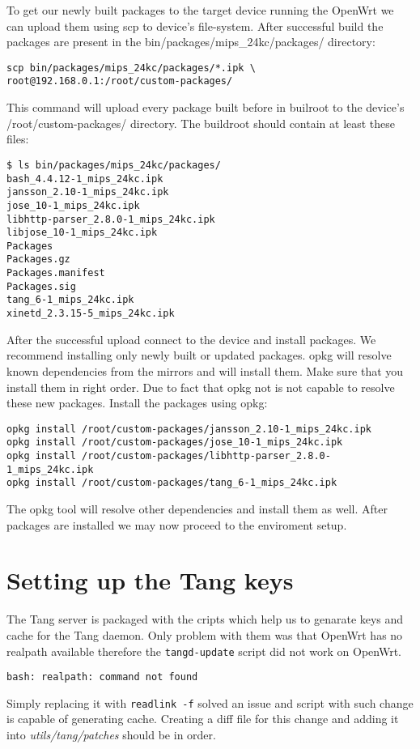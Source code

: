 To get our newly built packages to the target device running the OpenWrt we can upload them using scp to device's file-system.
After successful build the packages are present in the bin/packages/mips\_24kc/packages/ directory:
\begin{lstlisting}[columns=fixed,basicstyle=\ttfamily\footnotesize,tabsize=4,backgroundcolor=\color{yellow!10}]
scp bin/packages/mips_24kc/packages/*.ipk \
root@192.168.0.1:/root/custom-packages/
\end{lstlisting}
This command will upload every package built before in builroot to the device's /root/custom-packages/ directory.
The buildroot should contain at least these files:
\begin{lstlisting}[columns=fixed,basicstyle=\ttfamily\footnotesize,tabsize=4,backgroundcolor=\color{yellow!10}]
$ ls bin/packages/mips_24kc/packages/
bash_4.4.12-1_mips_24kc.ipk
jansson_2.10-1_mips_24kc.ipk
jose_10-1_mips_24kc.ipk
libhttp-parser_2.8.0-1_mips_24kc.ipk
libjose_10-1_mips_24kc.ipk
Packages
Packages.gz
Packages.manifest
Packages.sig
tang_6-1_mips_24kc.ipk
xinetd_2.3.15-5_mips_24kc.ipk
\end{lstlisting}
After the successful upload connect to the device and install packages.
We recommend installing only newly built or updated packages.
opkg will resolve known dependencies from the mirrors and will install them.
Make sure that you install them in right order.
Due to fact that opkg not is not capable to resolve these new packages.
Install the packages using opkg:
\begin{lstlisting}[columns=fixed,basicstyle=\ttfamily\footnotesize,tabsize=4,backgroundcolor=\color{yellow!10}]
opkg install /root/custom-packages/jansson_2.10-1_mips_24kc.ipk
opkg install /root/custom-packages/jose_10-1_mips_24kc.ipk
opkg install /root/custom-packages/libhttp-parser_2.8.0-1_mips_24kc.ipk
opkg install /root/custom-packages/tang_6-1_mips_24kc.ipk
\end{lstlisting}
The opkg tool will resolve other dependencies and install them as well.
After packages are installed we may now proceed to the enviroment setup.



\section{Setting up the Tang keys}
The Tang server is packaged with the cripts which help us to genarate keys and cache for the Tang daemon.
Only problem with them was that OpenWrt has no realpath available therefore the {\tt tangd-update} script did not work on OpenWrt.
\begin{lstlisting}[columns=fixed,basicstyle=\ttfamily\footnotesize,tabsize=4,backgroundcolor=\color{yellow!10}]
bash: realpath: command not found
\end{lstlisting}
Simply replacing it with {\tt readlink -f} solved an issue and script with such change is capable of generating cache.
Creating a diff file for this change and adding it into {\it utils/tang/patches} should be in order.

